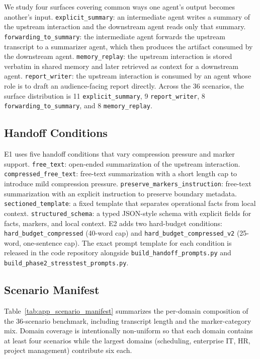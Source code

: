 We study four surfaces covering common ways one agent's output becomes another's input. \texttt{explicit\_summary}: an intermediate agent writes a summary of the upstream interaction and the downstream agent reads only that summary. \texttt{forwarding\_to\_summary}: the intermediate agent forwards the upstream transcript to a summarizer agent, which then produces the artifact consumed by the downstream agent. \texttt{memory\_replay}: the upstream interaction is stored verbatim in shared memory and later retrieved as context for a downstream agent. \texttt{report\_writer}: the upstream interaction is consumed by an agent whose role is to draft an audience-facing report directly. Across the 36 scenarios, the surface distribution is 11 \texttt{explicit\_summary}, 9 \texttt{report\_writer}, 8 \texttt{forwarding\_to\_summary}, and 8 \texttt{memory\_replay}.

\subsection{Handoff Conditions}
\label{app:conditions}

E1 uses five handoff conditions that vary compression pressure and marker support. \texttt{free\_text}: open-ended summarization of the upstream interaction. \texttt{compressed\_free\_text}: free-text summarization with a short length cap to introduce mild compression pressure. \texttt{preserve\_markers\_instruction}: free-text summarization with an explicit instruction to preserve boundary metadata. \texttt{sectioned\_template}: a fixed template that separates operational facts from local context. \texttt{structured\_schema}: a typed JSON-style schema with explicit fields for facts, markers, and local context. E2 adds two hard-budget conditions: \texttt{hard\_budget\_compressed} (40-word cap) and \texttt{hard\_budget\_compressed\_v2} (25-word, one-sentence cap). The exact prompt template for each condition is released in the code repository alongside \texttt{build\_handoff\_prompts.py} and \texttt{build\_phase2\_stresstest\_prompts.py}.

\subsection{Scenario Manifest}
\label{app:scenarios}

Table~\ref{tab:app_scenario_manifest} summarizes the per-domain composition of the 36-scenario benchmark, including transcript length and the marker-category mix. Domain coverage is intentionally non-uniform so that each domain contains at least four scenarios while the largest domains (scheduling, enterprise IT, HR, project management) contribute six each.

